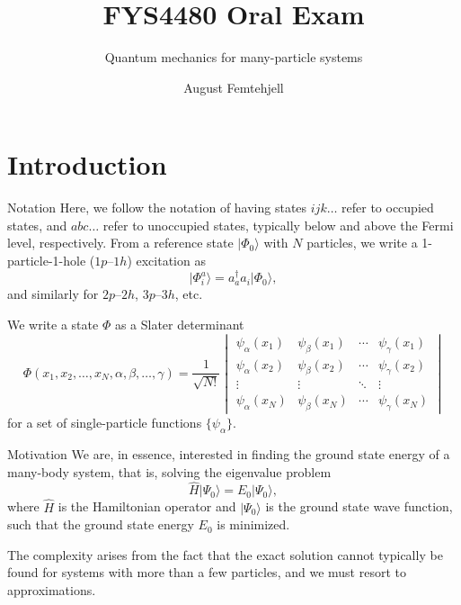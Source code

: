 \documentclass[UKenglish,aspectratio=169]{beamer}
\title{FYS4480 Oral Exam}
\subtitle{Quantum mechanics for many-particle systems}
\author{August Femtehjell}
\begin{document}
\uiofrontpage[
    date={16th December, 2024},
]

\section{Introduction}
\begin{frame}{Notation}
    Here, we follow the notation of having states $ijk\ldots$ refer
    to occupied states, and $abc\ldots$ refer to unoccupied states,
    typically below and above the Fermi level, respectively.
    From a reference state $\lvert \Phi_0 \rangle$ with $N$
    particles, we write a 1-particle-1-hole ($1p$--$1h$) excitation as
    \begin{equation}
        \lvert \Phi_{i}^{a} \rangle
        = a_{a}^\dagger a_{i} \lvert \Phi_0 \rangle,
    \end{equation}
    and similarly for $2p$--$2h$, $3p$--$3h$, etc.

    We write a state $\Phi$ as a Slater determinant
    \begin{equation}
        \Phi(x_1, x_2, \ldots, x_N, \alpha, \beta, \ldots, \gamma) =
        \frac{1}{\sqrt{N!}}
        \begin{vmatrix}
            \psi_{\alpha}(x_1) & \psi_{\beta}(x_1) & \cdots & \psi_{\gamma}(x_1) \\
            \psi_{\alpha}(x_2) & \psi_{\beta}(x_2) & \cdots & \psi_{\gamma}(x_2) \\
            \vdots & \vdots & \ddots & \vdots \\
            \psi_{\alpha}(x_N) & \psi_{\beta}(x_N) & \cdots & \psi_{\gamma}(x_N)
        \end{vmatrix}
    \end{equation}
    for a set of single-particle functions $\{\psi_{\alpha}\}$.
\end{frame}

\begin{frame}{Motivation}
    We are, in essence, interested in finding the ground state energy
    of a many-body system, that is, solving the eigenvalue problem
    \begin{equation}
        \hat{H} \lvert \Psi_0 \rangle = E_0 \lvert \Psi_0 \rangle,
    \end{equation}
    where $\hat{H}$ is the Hamiltonian operator and $\lvert \Psi_0
    \rangle$ is the ground state wave function, such that the ground
    state energy $E_0$ is minimized.

    \bigskip

    The complexity arises from the fact that the exact solution
    cannot typically be found for systems with more than a few
    particles, and we must resort to approximations.
\end{frame}
\end{document}
